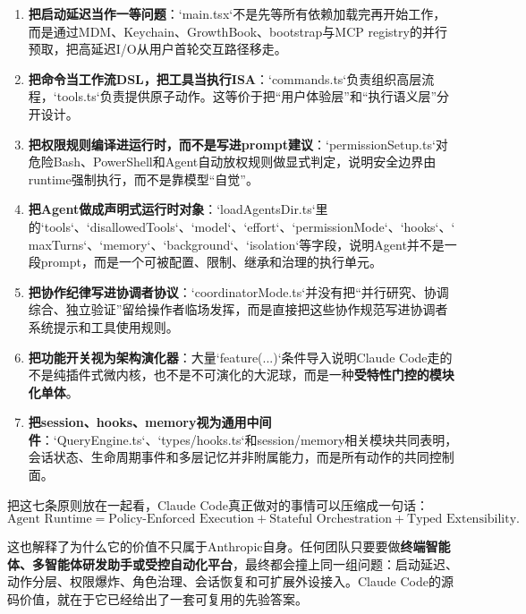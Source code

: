 \documentclass[12pt,a4paper]{article}
\begin{document}
\begin{enumerate}
    \item \textbf{把启动延迟当作一等问题}：`main.tsx`不是先等所有依赖加载完再开始工作，而是通过MDM、Keychain、GrowthBook、bootstrap与MCP registry的并行预取，把高延迟I/O从用户首轮交互路径移走。
    \item \textbf{把命令当工作流DSL，把工具当执行ISA}：`commands.ts`负责组织高层流程，`tools.ts`负责提供原子动作。这等价于把“用户体验层”和“执行语义层”分开设计。
    \item \textbf{把权限规则编译进运行时，而不是写进prompt建议}：`permissionSetup.ts`对危险Bash、PowerShell和Agent自动放权规则做显式判定，说明安全边界由runtime强制执行，而不是靠模型“自觉”。
    \item \textbf{把Agent做成声明式运行时对象}：`loadAgentsDir.ts`里的`tools`、`disallowedTools`、`model`、`effort`、`permissionMode`、`hooks`、`maxTurns`、`memory`、`background`、`isolation`等字段，说明Agent并不是一段prompt，而是一个可被配置、限制、继承和治理的执行单元。
    \item \textbf{把协作纪律写进协调者协议}：`coordinatorMode.ts`并没有把“并行研究、协调综合、独立验证”留给操作者临场发挥，而是直接把这些协作规范写进协调者系统提示和工具使用规则。
    \item \textbf{把功能开关视为架构演化器}：大量`feature(...)`条件导入说明Claude Code走的不是纯插件式微内核，也不是不可演化的大泥球，而是一种\textbf{受特性门控的模块化单体}。
    \item \textbf{把session、hooks、memory视为通用中间件}：`QueryEngine.ts`、`types/hooks.ts`和session/memory相关模块共同表明，会话状态、生命周期事件和多层记忆并非附属能力，而是所有动作的共同控制面。
\end{enumerate}

把这七条原则放在一起看，Claude Code真正做对的事情可以压缩成一句话：
\begin{equation}
\text{Agent Runtime} = \text{Policy-Enforced Execution} + \text{Stateful Orchestration} + \text{Typed Extensibility}.
\end{equation}

这也解释了为什么它的价值不只属于Anthropic自身。任何团队只要要做\textbf{终端智能体、多智能体研发助手或受控自动化平台}，最终都会撞上同一组问题：启动延迟、动作分层、权限爆炸、角色治理、会话恢复和可扩展外设接入。Claude Code的源码价值，就在于它已经给出了一套可复用的先验答案。
\end{document}
